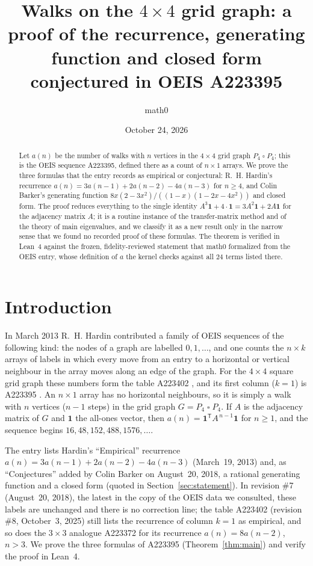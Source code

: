 \documentclass[11pt]{amsart}
\title[Walks on the $4\times4$ grid graph (OEIS A223395)]{Walks on the $4\times4$ grid graph: a proof of the recurrence, generating function and closed form conjectured in OEIS A223395}
\author{math0}
\date{October 24, 2026}
\theoremstyle{plain}
\theoremstyle{definition}
\newcommand{\one}{\mathbf{1}}
\newcommand{\sq}{\mathbin{\square}}
\begin{document}
\begin{abstract}
Let $a(n)$ be the number of walks with $n$ vertices in the $4\times4$ grid graph $P_4\sq P_4$; this is the OEIS sequence A223395, defined there as a count of $n\times1$ arrays.
We prove the three formulas that the entry records as empirical or conjectural: R.~H. Hardin's recurrence $a(n)=3a(n-1)+2a(n-2)-4a(n-3)$ for $n\ge4$, and Colin Barker's generating function $8x(2-3x^2)/((1-x)(1-2x-4x^2))$ and closed form.
The proof reduces everything to the single identity $A^3\one+4\cdot\one=3A^2\one+2A\one$ for the adjacency matrix $A$; it is a routine instance of the transfer-matrix method and of the theory of main eigenvalues, and we classify it as a new result only in the narrow sense that we found no recorded proof of these formulas.
The theorem is verified in Lean~4 against the frozen, fidelity-reviewed statement that math0 formalized from the OEIS entry, whose definition of $a$ the kernel checks against all $24$ terms listed there.
\end{abstract}
\maketitle

\section{Introduction}

In March 2013 R.~H. Hardin contributed a family of OEIS sequences of the following kind: the nodes of a graph are labelled $0,1,\dots$, and one counts the $n\times k$ arrays of labels in which every move from an entry to a horizontal or vertical neighbour in the array moves along an edge of the graph.
For the $4\times4$ square grid graph these numbers form the table A223402 \cite{A223402}, and its first column ($k=1$) is A223395 \cite{A223395}. An $n\times1$ array has no horizontal neighbours, so it is simply a walk with $n$ vertices ($n-1$ steps) in the grid graph $G=P_4\sq P_4$. If $A$ is the adjacency matrix of $G$ and $\one$ the all-ones vector, then $a(n)=\one^{\mathsf T}A^{\,n-1}\one$ for $n\ge1$, and the sequence begins $16,48,152,488,1576,\dots$.

The entry \cite{A223395} lists Hardin's ``Empirical'' recurrence $a(n)=3a(n-1)+2a(n-2)-4a(n-3)$ (March~19, 2013) and, as ``Conjectures'' added by Colin Barker on August~20, 2018, a rational generating function and a closed form (quoted in Section~\ref{sec:statement}). In revision \#7 (August~20, 2018), the latest in the copy of the OEIS data we consulted, these labels are unchanged and there is no correction line; the table A223402 (revision \#8, October~3, 2025) still lists the recurrence of column $k=1$ as empirical, and so does the $3\times3$ analogue A223372 \cite{A223372} for its recurrence $a(n)=8a(n-2)$, $n>3$. We prove the three formulas of A223395 (Theorem~\ref{thm:main}) and verify the proof in Lean~4.
\end{document}
